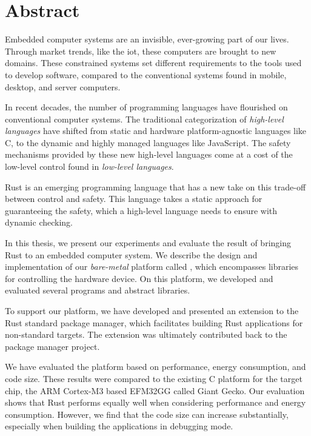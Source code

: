 
\chapter{Abstract}
\label{chap:abstract}

Embedded computer systems are an invisible, ever-growing part of our lives.
Through market trends, like the \glsdesc{iot}, these computers are brought to new domains.
These constrained systems set different requirements to the tools used to develop software, compared to the conventional systems found in mobile, desktop, and server computers.

In recent decades, the number of programming languages have flourished on conventional computer systems.
The traditional categorization of \emph{high-level languages} have shifted from static and hardware platform-agnostic languages like C, to the dynamic and highly managed languages like JavaScript.
The safety mechanisms provided by these new high-level languages come at a cost of the low-level control found in \emph{low-level languages}.

Rust is an emerging programming language that has a new take on this trade-off between control and safety.
This language takes a static approach for guaranteeing the safety, which a high-level language needs to ensure with dynamic checking.

In this thesis, we present our experiments and evaluate the result of bringing Rust to an embedded computer system.
We describe the design and implementation of our \emph{bare-metal} platform called {\rg}, which encompasses libraries for controlling the hardware device.
On this platform, we developed and evaluated several programs and abstract libraries.

To support our platform, we have developed and presented an extension to the Rust standard package manager, which facilitates building Rust applications for non-standard targets.
The extension was ultimately contributed back to the package manager project.

We have evaluated the platform based on performance, energy consumption, and code size.
These results were compared to the existing C platform for the target chip, the ARM Cortex-M3 based EFM32GG called Giant Gecko.
Our evaluation shows that Rust performs equally well when considering performance and energy consumption.
However, we find that the code size can increase substantially, especially when building the applications in debugging mode.

